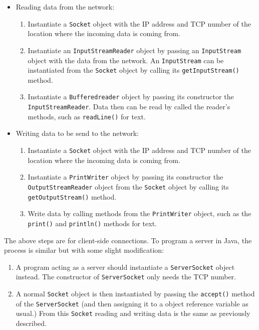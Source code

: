 \documentclass{tufte-handout}
\begin{document}
    \begin{itemize}
        \item Reading data from the network:
        \begin{enumerate}
            \item Instantiate a \texttt{Socket} object with the IP address and TCP number of the location where the incoming data is coming from.
            \item Instantiate an \texttt{InputStreamReader} object by passing an \texttt{InputStream} object with the data from the network. An \texttt{InputStream} can be instantiated from the \texttt{Socket} object by calling its \texttt{getInputStream()} method.
            \item Instantiate a \texttt{Bufferedreader} object by passing its constructor the \texttt{InputStreamReader}. Data then can be read by called the reader's methods, such as \texttt{readLine()} for text.
        \end{enumerate}
        \item Writing data to be send to the network:
        \begin{enumerate}
            \item Instantiate a \texttt{Socket} object with the IP address and TCP number of the location where the incoming data is coming from.
            \item Instantiate a \texttt{PrintWriter} object by passing its constructor the \texttt{OutputStreamReader} object from the \texttt{Socket} object by calling its \texttt{getOutputStream()} method.
            \item Write data by calling methods from the \texttt{PrintWriter} object, such as the \texttt{print()} and \texttt{println()} methods for text.
        \end{enumerate}
    \end{itemize}

    The above steps are for client-side connections. To program a server in Java, the process is similar but with some slight modification:

    \begin{enumerate}
        \item A program acting as a server should instantiate a \texttt{ServerSocket} object instead. The constructor of \texttt{ServerSocket} only needs the TCP number.
        \item A normal \texttt{Socket} object is then instantiated by passing the \texttt{accept()} method of the \texttt{ServerSocket} (and then assigning it to a object reference variable as usual.) From this \texttt{Socket} reading and writing data is the same as previously described.
    \end{enumerate}
\end{document}
